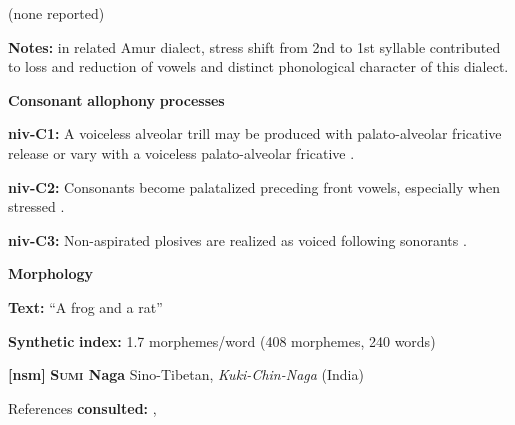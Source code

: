 \documentclass[output=paper]{langsci/langscibook}
\begin{document}
\begin{styleBody}
(none reported)
\end{styleBody}

\begin{styleBody}
\textbf{Notes:} in related Amur dialect, stress shift from 2nd to 1st syllable contributed to loss and reduction of vowels and distinct phonological character of this dialect.
\end{styleBody}

\begin{styleBody}
\textbf{Consonant} \textbf{allophony} \textbf{processes}
\end{styleBody}

\begin{styleBody}
\textbf{niv-C1:} A voiceless alveolar trill may be produced with palato-alveolar fricative release or vary with a voiceless palato-alveolar fricative \citep[26]{Shiraishi2006}.
\end{styleBody}

\begin{styleBody}
\textbf{niv-C2:} Consonants become palatalized preceding front vowels, especially when stressed \citep[23]{Shiraishi2006}.
\end{styleBody}

\begin{styleBody}
\textbf{niv-C3:} Non-aspirated plosives are realized as voiced following sonorants \citep[25]{Shiraishi2006}.
\end{styleBody}

\begin{styleBody}
\textbf{Morphology}
\end{styleBody}

\begin{styleBody}
\textbf{Text:} “A frog and a rat” \citep[58-61]{Gruzdeva1998}
\end{styleBody}

\begin{styleBody}
\textbf{Synthetic} \textbf{index:} 1.7 morphemes/word (408 morphemes, 240 words)
\end{styleBody}

\begin{styleBody}
\textbf{[nsm]}   \textbf{\textsc{Sumi} \textbf{Naga}}  Sino-Tibetan, \textit{Kuki-Chin-Naga} (India)
\end{styleBody}

\begin{styleBody}
References \textbf{consulted:} \citet{Teo2009}, \citet{Teo2012}
\end{styleBody}
\end{document}
